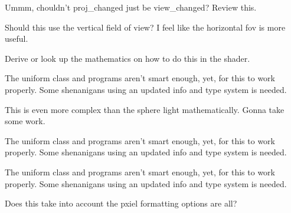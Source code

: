 \begin{DoxyRefList}
\item[\label{todo__todo000017}%
\hypertarget{todo__todo000017}{}%
Class \hyperlink{classgfx_1_1proj__cam}{gfx\-:\-:proj\-\_\-cam} ]Ummm, chouldn't proj\-\_\-changed just be view\-\_\-changed? Review this.  
\item[\label{todo__todo000018}%
\hypertarget{todo__todo000018}{}%
Member \hyperlink{classgfx_1_1proj__cam_1_1settings_aae956f82f4b9b48f667381e1f1a7ecd6}{gfx\-:\-:proj\-\_\-cam\-:\-:settings\-:\-:field\-\_\-of\-\_\-view} (d\-\_\-angle const \&fov\-\_\-vert)]Should this use the vertical field of view? I feel like the horizontal fov is more useful.  
\item[\label{todo__todo000024}%
\hypertarget{todo__todo000024}{}%
Class \hyperlink{classgfx_1_1sphere__light}{gfx\-:\-:sphere\-\_\-light} ]Derive or look up the mathematics on how to do this in the shader.  
\item[\label{todo__todo000021}%
\hypertarget{todo__todo000021}{}%
Member \hyperlink{classgfx_1_1sphere__light_a357d9e69656557f7055bfbe6e6952498}{gfx\-:\-:sphere\-\_\-light\-:\-:upload\-\_\-uniform} (program \&prgm, std\-::string const \&name)]The uniform class and programs aren't smart enough, yet, for this to work properly. Some shenanigans using an updated info and type system is needed.  
\item[\label{todo__todo000025}%
\hypertarget{todo__todo000025}{}%
Class \hyperlink{classgfx_1_1spot__light}{gfx\-:\-:spot\-\_\-light} ]This is even more complex than the sphere light mathematically. Gonna take some work.  
\item[\label{todo__todo000022}%
\hypertarget{todo__todo000022}{}%
Member \hyperlink{classgfx_1_1spot__light_adde12a9e73e9f00044894af91008c869}{gfx\-:\-:spot\-\_\-light\-:\-:upload\-\_\-uniform} (program \&prgm, std\-::string const \&name)]The uniform class and programs aren't smart enough, yet, for this to work properly. Some shenanigans using an updated info and type system is needed.  
\item[\label{todo__todo000023}%
\hypertarget{todo__todo000023}{}%
Member \hyperlink{classgfx_1_1sun__light_a786c5ed1b4b222b38143e7d521459236}{gfx\-:\-:sun\-\_\-light\-:\-:upload\-\_\-uniform} (program \&prgm, std\-::string const \&name)]The uniform class and programs aren't smart enough, yet, for this to work properly. Some shenanigans using an updated info and type system is needed.  
\item[\label{todo__todo000029}%
\hypertarget{todo__todo000029}{}%
Member \hyperlink{classgfx_1_1texture__1D_a3b5351295c03e9a29f8e8291d57078bf}{gfx\-:\-:texture\-\_\-1\-D\-:\-:load\-\_\-data} ()]Does this take into account the pxiel formatting options are all?  

\end{DoxyRefList}
